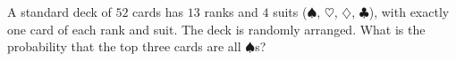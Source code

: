 A standard deck of $52$ cards has $13$ ranks and $4$ suits ($\spadesuit$, $\heartsuit$, $\diamondsuit$, $\clubsuit$), with exactly one card of each rank and suit. The deck is randomly arranged. What is the probability that the top three cards are all $\spadesuit$s?
